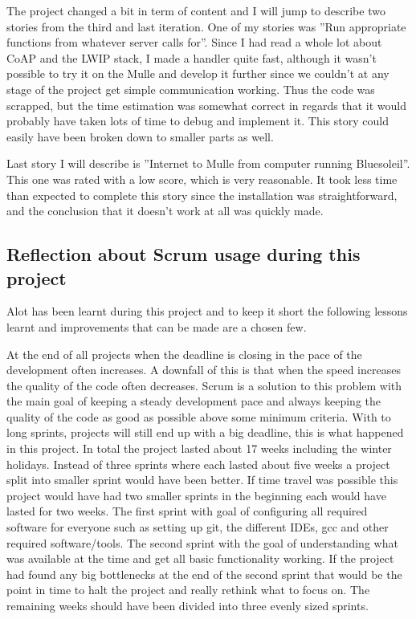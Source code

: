The project changed a bit in term of content and I will jump to describe two stories from the third and last iteration.
One of my stories was ''Run appropriate functions from whatever server calls for''. Since I had read a whole lot about CoAP and 
the LWIP stack, I made a handler quite fast, although it wasn't possible to try it on the Mulle and develop it further since
we couldn't at any stage of the project get simple communication working. Thus the code was scrapped, but the time estimation was somewhat
correct in regards that it would probably have taken lots of time to debug and implement it. 
This story could easily have been broken down to smaller parts as well.

Last story I will describe is ''Internet to Mulle from computer running Bluesoleil''. This one was rated with a low score, which is 
very reasonable. It took less time than expected to complete this story since the installation was straightforward, and the conclusion
that it doesn't work at all was quickly made.

\subsection{Reflection about Scrum usage during this project}
Alot has been learnt during this project and to keep it short the following lessons learnt and improvements that can be made are a chosen few.

At the end of all projects when the deadline is closing in the pace of the development often increases.
A downfall of this is that when the speed increases the quality of the code often decreases.
Scrum is a solution to this problem with the main goal of keeping a steady development pace and always keeping the quality of the code as good as possible above some minimum criteria.
With to long sprints, projects will still end up with a big deadline, this is what happened in this project.
In total the project lasted about 17 weeks including the winter holidays.
Instead of three sprints where each lasted about five weeks a project split into smaller sprint would have been better.
If time travel was possible this project would have had two smaller sprints in the beginning each would have lasted for two weeks.
The first sprint with goal of configuring all required software for everyone such as setting up git, the different IDEs, gcc and other required software/tools.
The second sprint with the goal of understanding what was available at the time and get all basic functionality working.
If the project had found any big bottlenecks at the end of the second sprint that would be the point in time to halt the project and really rethink what to focus on.
The remaining weeks should have been divided into three evenly sized sprints.

